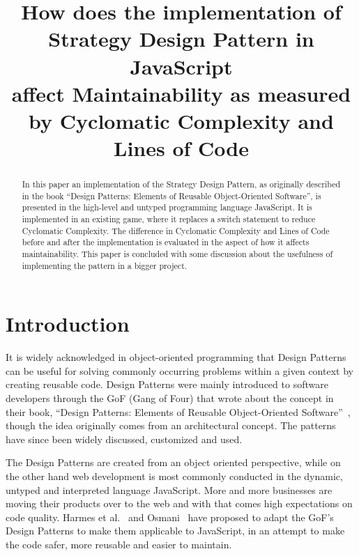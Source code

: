 \documentclass[conference, a4paper]{IEEEtran}
\begin{document}
\title{How does the implementation of\\
Strategy Design Pattern in JavaScript\\
affect Maintainability as measured by Cyclomatic Complexity and Lines of Code}
\author{
}

\maketitle

\begin{abstract}
	 In this paper an implementation of the Strategy Design Pattern, as originally described in the book ``Design Patterns: Elements of Reusable Object-Oriented Software'', is presented in the high-level and untyped programming language JavaScript. It is implemented in an existing game, where it replaces a switch statement to reduce Cyclomatic Complexity. The difference in Cyclomatic Complexity and Lines of Code before and after the implementation is evaluated in the aspect of how it affects maintainability. This paper is concluded with some discussion about the usefulness of implementing the pattern in a bigger project.
\end{abstract}

\section{Introduction}
\label{sec:Introduction}
It is widely acknowledged in object-oriented programming that Design Patterns can be useful for solving commonly occurring problems within a given context  by creating reusable code. Design Patterns were mainly introduced to software developers through the GoF (Gang of Four) that wrote about the concept in their book, ``Design Patterns: Elements of Reusable Object-Oriented Software''~\cite{bibitem:GoF}, though the idea originally comes from an architectural concept. The patterns have since been widely discussed, customized and used.

The Design Patterns are created from an object oriented perspective, while on the other hand web development is most commonly conducted in the dynamic, untyped and interpreted language JavaScript. More and more businesses are moving their products over to the web and with that comes high expectations on code quality. Harmes et al.~\cite{bibitem:DiazHarmes} and Osmani~\cite{bibitem:Osmani} have proposed to adapt the GoF's Design Patterns to make them applicable to JavaScript, in an attempt to make the code safer, more reusable and easier to maintain.
\end{document}
